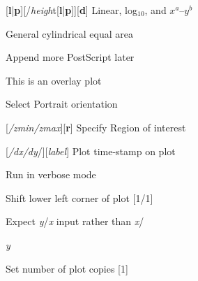\documentclass{article}
\begin{document}
\par 	{}[{\bf l}|{\bf p}][/{\it heigh}t[{\bf l}|{\bf p}]][{\bf d}]	Linear, log$_{10}$, and $x^a$--$y^b$\par 

\par 	{}	General cylindrical equal area\par 

\par {}	Append more PostScript later\par 

\par {}	This is an overlay plot\par 

\par {}	Select Portrait orientation\par 

\par {}[{\it /zmin/zmax}][{\bf r}]	Specify Region of interest\par 

\par {}[{\it /dx/dy}/][{\it label}]	Plot time-stamp on plot\par 

\par {}	Run in verbose mode\par 

\par {} 	Shift lower left corner of plot [1/1]\par 

\par \Opt{:}	Expect {\it y}/{\it x} input rather than {\it x}/{\it y\par 

}\par {}	Set number of plot copies [1]\par 
\end{document}
